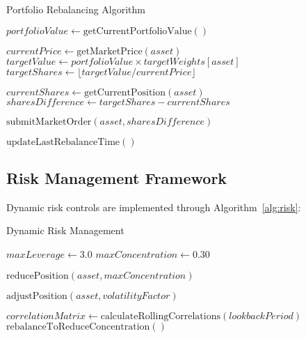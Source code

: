 \documentclass[onecolumn,ieee]{arithmaxresearch}
\begin{document}
\begin{algorithm}[h]
\caption{Portfolio Rebalancing Algorithm}
\label{alg:rebalance}
\begin{algorithmic}[1]
        \State \Return {}
    \EndIf
    
    \State $portfolioValue \gets \text{getCurrentPortfolioValue}()$
    
        \State $currentPrice \gets \text{getMarketPrice}(asset)$
        \State $targetValue \gets portfolioValue \times targetWeights[asset]$
        \State $targetShares \gets \lfloor targetValue / currentPrice \rfloor$
        
        \State $currentShares \gets \text{getCurrentPosition}(asset)$
        \State $sharesDifference \gets targetShares - currentShares$
        
            \State $\text{submitMarketOrder}(asset, sharesDifference)$
        \EndIf
    \EndFor
    
    \State $\text{updateLastRebalanceTime}()$
\EndFunction
\end{algorithmic}
\end{algorithm}

\subsection{Risk Management Framework}

Dynamic risk controls are implemented through Algorithm~\ref{alg:risk}:

\begin{algorithm}[h]
\caption{Dynamic Risk Management}
\label{alg:risk}
\begin{algorithmic}[1]
    \State $maxLeverage \gets 3.0$
    \State $maxConcentration \gets 0.30$
    
            \State $\text{reducePosition}(asset, maxConcentration)$
        \EndIf
        
            \State $\text{adjustPosition}(asset, volatilityFactor)$
        \EndIf
    \EndFor
    
    \State $correlationMatrix \gets \text{calculateRollingCorrelations}(lookbackPeriod)$
        \State $\text{rebalanceToReduceConcentration}()$
    \EndIf
\EndFunction
\end{algorithmic}
\end{algorithm}
\end{document}
